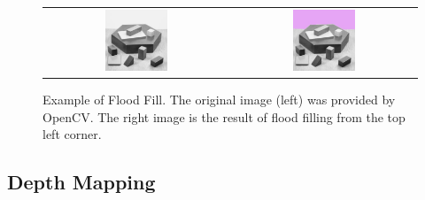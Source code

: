 \begin{figure}[H]
    \begin{center}
    \begin{tabular}{ c c }
        \includegraphics[width=0.35\textwidth]{Figures/blox.jpg} &
        \includegraphics[width=0.35\textwidth]{Figures/bloxFilled.jpg}
    \end{tabular}
    \caption[Example of Flood Fill]{Example of Flood Fill. The original image (left) was provided by OpenCV. The right image is the result of flood filling from the top left corner.}
    \label{fig:EgFloodFill}
    \end{center}
\end{figure}

\subsection{Depth Mapping}
